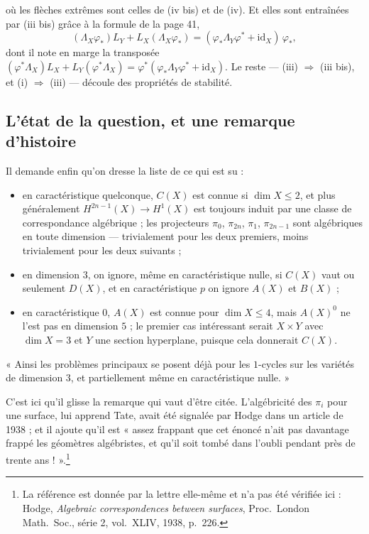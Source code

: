 \documentclass[11pt,a4paper]{article}
\begin{document}
où les flèches extrêmes sont celles de (iv bis) et de (iv). Et elles sont
entraînées par (iii bis) grâce à la formule de la page 41,
\[
(\Lambda_{X}\varphi_{*})L_{Y} + L_{X}(\Lambda_{X}\varphi_{*})
= (\varphi_{*}\Lambda_{Y}\varphi^{*} + \mathrm{id}_{X})\,\varphi_{*},
\]
dont il note en marge la transposée
$(\varphi^{*}\Lambda_{X})L_{X} + L_{Y}(\varphi^{*}\Lambda_{X})
= \varphi^{*}(\varphi_{*}\Lambda_{Y}\varphi^{*} + \mathrm{id}_{X})$. Le reste
--- (iii) $\Rightarrow$ (iii bis), et (i) $\Rightarrow$ (iii) --- découle des
propriétés de stabilité.

\subsection*{L'état de la question, et une remarque d'histoire}

Il demande enfin qu'on dresse la liste de ce qui est su :

\begin{itemize}
  \item en caractéristique quelconque, $C(X)$ est connue si $\dim X \leqslant
  2$, et plus généralement $H^{2n-1}(X) \to H^{1}(X)$ est toujours induit par
  une classe de correspondance algébrique ; les projecteurs $\pi_{0}$,
  $\pi_{2n}$, $\pi_{1}$, $\pi_{2n-1}$ sont algébriques en toute dimension
  --- trivialement pour les deux premiers, moins trivialement pour les deux
  suivants ;
  \item en dimension $3$, on ignore, même en caractéristique nulle, si $C(X)$
  vaut ou seulement $D(X)$, et en caractéristique $p$ on ignore $A(X)$ et
  $B(X)$ ;
  \item en caractéristique $0$, $A(X)$ est connue pour $\dim X \leqslant 4$,
  mais $A(X)^{0}$ ne l'est pas en dimension $5$ ; le premier cas intéressant
  serait $X \times Y$ avec $\dim X = 3$ et $Y$ une section hyperplane, puisque
  cela donnerait $C(X)$.
\end{itemize}

« Ainsi les problèmes principaux se posent déjà pour les $1$-cycles sur les
variétés de dimension $3$, et partiellement même en caractéristique nulle. »

C'est ici qu'il glisse la remarque qui vaut d'être citée. L'algébricité des
$\pi_{i}$ pour une surface, lui apprend Tate, avait été signalée par Hodge dans
un article de 1938 ; et il ajoute qu'il est « assez frappant que cet énoncé
n'ait pas davantage frappé les géomètres algébristes, et qu'il soit tombé dans
l'oubli pendant près de trente ans ! ».\footnote{La référence est donnée par la
lettre elle-même et n'a pas été vérifiée ici : Hodge, \emph{Algebraic
correspondences between surfaces}, Proc.\ London Math.\ Soc., série 2, vol.\
XLIV, 1938, p.\ 226.}
\end{document}
